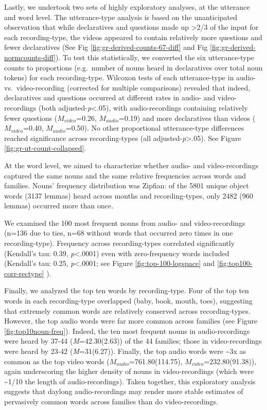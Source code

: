 \documentclass[man]{apa6}
\theoremstyle{definition}
\theoremstyle{definition}
\theoremstyle{definition}
\theoremstyle{remark}
\begin{document}
Lastly, we undertook two sets of highly exploratory analyses, at the
utterance and word level. The utterance-type analysis is based on the
unanticipated observation that while declaratives and questions made up
\textgreater{}2/3 of the input for each recording-type, the videos
appeared to contain relatively more questions and fewer declaratives
(See Fig \ref{fig:gr-derived-counts-67-diff} and Fig
\ref{fig:gr-derived-normcounts-diff}). To test this statistically, we
converted the six utterance-type counts to proportions (e.g.~number of
nouns heard in declaratives over total noun tokens) for each
recording-type. Wilcoxon tests of each utterance-type in audio-
vs.~video-recording (corrected for multiple comparisons) revealed that
indeed, declaratives and questions occurred at different rates in audio-
and video-recordings (both adjusted-\emph{p}\textless{}.05), with
audio-recordings containing relatively fewer questions
(\(M_{video}\)=0.26, \(M_{audio}\)=0.19) and more declaratives than
videos (\(M_{video}\)=0.40, \(M_{audio}\)=0.50). No other proportional
utterance-type differences reached significance across recording-types
(all adjusted-\emph{p}\textgreater{}.05). See Figure
\ref{fig:gr-ut-count-collapsed}.

At the word level, we aimed to characterize whether audio- and
video-recordings captured the same nouns and the same relative
frequencies across words and families. Nouns' frequency distribution was
Zipfian: of the 5801 unique object words (3137 lemmas) heard across
months and recording-types, only 2482 (960 lemmas) occurred more than
once.

We examined the 100 most frequent nouns from audio- and video-recordings
(n=136 due to ties, n=68 without words that occurred zero times in one
recording-type). Frequency across recording-types correlated
significantly (Kendall's tau: 0.39, \emph{p}\textless{}.0001) even with
zero-frequency words included (Kendall's tau: 0.25,
\emph{p}\textless{}.0001; see Figure \ref{fig:top-100-logspace} and
\ref{fig:top100-corr-rectype} ).

Finally, we analyzed the top ten words by recording-type. Four of the
top ten words in each recording-type overlapped (baby, book, mouth,
toes), suggesting that extremely common words are relatively conserved
across recording-types. However, the top audio words were far more
common across families (see Figure \ref{fig:top10noun-freq}). Indeed,
the ten most frequent nouns in audio-recordings were heard by 37-44
(\emph{M}=42.30(2.63)) of the 44 families; those in video-recordings
were heard by 23-42 (\emph{M}=31(6.27)). Finally, the top audio words
were \textasciitilde{}3x as common as the top video words
(\(M_{audio}\)=761.80(114.75), \(M_{video}\)=232.80(91.38)), again
underscoring the higher density of nouns in video-recordings (which were
\textasciitilde{}1/10 the length of audio-recordings). Taken together,
this exploratory analysis suggests that daylong audio-recordings may
render more stable estimates of pervasively common words across families
than do video-recordings.
\end{document}
